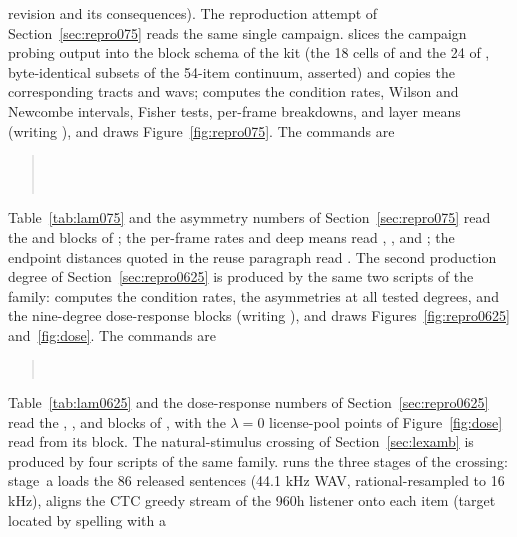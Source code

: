 \documentclass[11pt,a4paper]{article}
\newcommand{\lam}{\lambda}
\begin{document}
revision and its consequences).
The reproduction attempt of Section~\ref{sec:repro075} reads the same
single campaign.  slices the campaign probing
output into the block schema of the kit (the 18 cells of
 and the 24 of
, byte-identical subsets of the
54-item continuum, asserted) and copies the corresponding tracts and
wavs;  computes the condition rates, Wilson and
Newcombe intervals, Fisher tests, per-frame breakdowns, and layer means
(writing ), and
 draws Figure~\ref{fig:repro075}. The commands
are
\begin{quote}
\footnotesize
{}\\
\\
\end{quote}
Table~\ref{tab:lam075} and the asymmetry numbers of
Section~\ref{sec:repro075} read the  and
 blocks of ; the per-frame
rates and deep means read , , and
; the endpoint distances quoted in the reuse
paragraph read . The second production
degree of Section~\ref{sec:repro0625} is produced by the same two
scripts of the family:  computes the condition
rates, the asymmetries at all tested degrees, and the nine-degree
dose-response blocks (writing
), and
 draws Figures~\ref{fig:repro0625}
and~\ref{fig:dose}. The commands are
\begin{quote}
\footnotesize
{}\\
\end{quote}
Table~\ref{tab:lam0625} and the dose-response numbers of
Section~\ref{sec:repro0625} read the ,
, and  blocks of
, with the $\lam=0$ license-pool points of
Figure~\ref{fig:dose} read from its  block.
The natural-stimulus crossing of Section~\ref{sec:lexamb} is
produced by four scripts of the same family.
 runs the three stages of the
crossing: stage~a loads the 86 released sentences (44.1 kHz WAV,
rational-resampled to 16 kHz), aligns the CTC greedy stream of the
960h listener onto each item (target located by spelling with a
\end{document}
